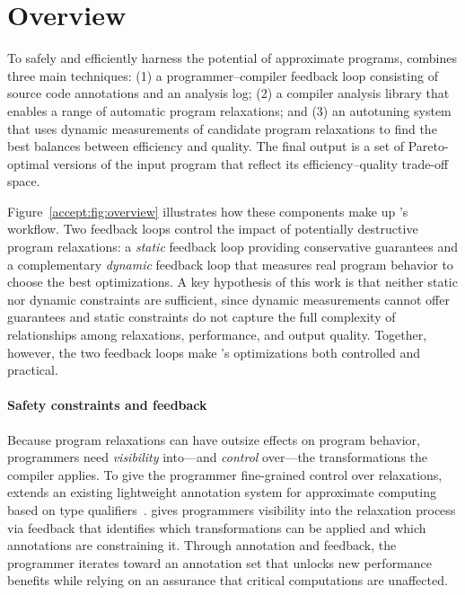 \section{Overview}


To safely and efficiently harness the potential of approximate programs,
\sysname combines three main techniques: (1) a programmer--compiler
feedback loop consisting of source code annotations and an analysis log; (2) a
compiler analysis library
that enables a range of automatic program relaxations; and (3) an autotuning
system that uses dynamic measurements of candidate program relaxations to find
the best balances between efficiency and quality. The final output is a set of
Pareto-optimal versions of the input program that reflect its
efficiency--quality trade-off space.

Figure~\ref{accept:fig:overview} illustrates
how these components make up \sysname's workflow.
Two feedback loops control the impact of
potentially destructive program relaxations: a \emph{static} feedback loop
providing
conservative guarantees
and a complementary \emph{dynamic} feedback loop that measures real
program behavior to choose the best optimizations.
%
A key hypothesis of this work is that neither static nor dynamic constraints
are sufficient, since dynamic measurements cannot offer guarantees and static
constraints do not capture the full complexity of relationships among
relaxations, performance, and output quality. Together, however, the two
feedback loops make \sysname's optimizations both controlled and practical.
%

\paragraph{Safety constraints and feedback}
Because program relaxations can have outsize effects on program behavior,
programmers need \emph{visibility} into---and \emph{control} over---the
transformations the compiler applies.
%
To give the programmer fine-grained control over relaxations, \sysname extends
an existing lightweight annotation system for approximate computing based on
type qualifiers~\cite{enerj}.
%
\sysname gives programmers visibility into the relaxation process via feedback
that identifies which transformations can be applied and which annotations are
constraining it.  Through annotation and feedback, the programmer iterates
toward an annotation set that unlocks new performance benefits while relying on
an assurance that critical computations are unaffected.

